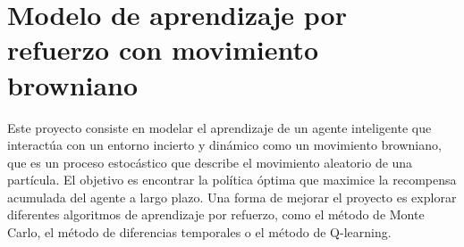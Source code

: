 \documentclass[10pt]{article}
\begin{document}
\section*{Modelo de aprendizaje por refuerzo con movimiento browniano}

Este proyecto consiste en modelar el aprendizaje de un agente inteligente que interactúa con un entorno incierto y dinámico como un movimiento browniano, que es un proceso estocástico que describe el movimiento aleatorio de una partícula. El objetivo es encontrar la política óptima que maximice la recompensa acumulada del agente a largo plazo. Una forma de mejorar el proyecto es explorar diferentes algoritmos de aprendizaje por refuerzo, como el método de Monte Carlo, el método de diferencias temporales o el método de Q-learning.
\end{document}
